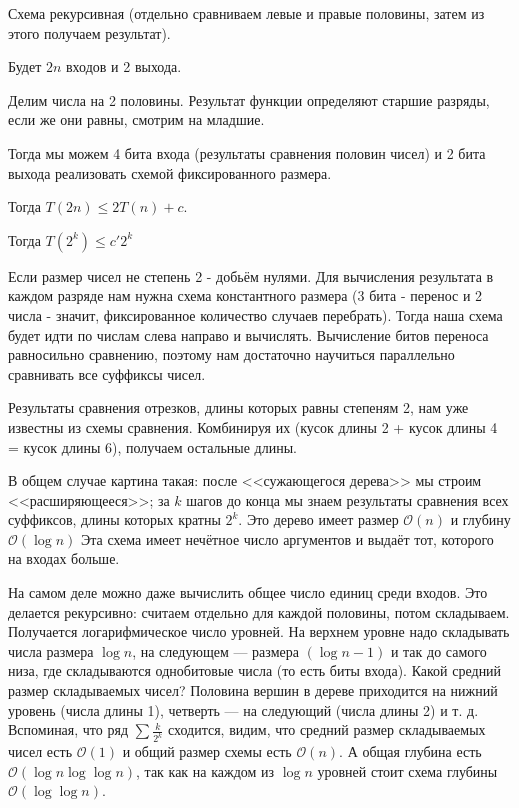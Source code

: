 Схема рекурсивная (отдельно сравниваем левые и правые половины, затем из этого получаем результат).

Будет $2n$ входов и 2 выхода. 

Делим числа на 2 половины. 
Результат функции определяют старшие разряды, если же они равны, смотрим на младшие.

Тогда мы можем 4 бита входа (результаты сравнения половин чисел) и 2 бита выхода реализовать схемой фиксированного размера.

Тогда $T(2n) \leq 2T(n) + c$. 

Тогда $T(2^k) \leq c'2^k$

Если размер чисел не степень 2 - добьём нулями.
Для вычисления результата в каждом разряде нам нужна схема константного размера (3 бита - перенос и 2 числа - значит, фиксированное количество случаев перебрать).
Тогда наша схема будет идти по числам слева направо и вычислять.
Вычисление битов переноса равносильно сравнению, поэтому нам достаточно научиться параллельно сравнивать все суффиксы чисел.

Результаты сравнения отрезков, длины которых равны степеням 2, нам уже известны из схемы сравнения.
Комбинируя их (кусок длины 2 + кусок длины 4 = кусок длины 6), получаем остальные длины.

В общем случае картина такая: после <<сужающегося дерева>> мы строим <<расширяющееся>>; 
за $k$ шагов до конца мы знаем результаты сравнения всех суффиксов, длины которых кратны $2^k$. 
Это дерево имеет размер $\mathcal{O}(n)$ и глубину $\mathcal{O}(\log n)$
Эта схема имеет нечётное число аргументов и выдаёт тот, которого на входах больше.

На самом деле можно даже вычислить общее число единиц среди входов. 
Это делается рекурсивно: считаем отдельно для каждой половины, потом складываем. 
Получается логарифмическое число уровней. 
На верхнем уровне надо складывать числа размера $\log n$, на следующем — размера $(\log n -1)$ и так до самого низа, где складываются однобитовые числа (то есть биты входа). 
Какой средний размер складываемых чисел? 
Половина вершин в дереве приходится на нижний уровень (числа длины 1), четверть — на следующий (числа длины 2) и т. д. 
Вспоминая, что ряд $\sum \frac{k}{2^k}$ сходится, видим, что средний размер складываемых чисел есть $\mathcal{O}(1)$ и общий размер схемы есть $\mathcal{O}(n)$. 
А общая глубина есть $\mathcal{O}(\log n \log\log n)$, так как на каждом из $\log n$ уровней стоит схема глубины $\mathcal{O}(\log\log n)$.
